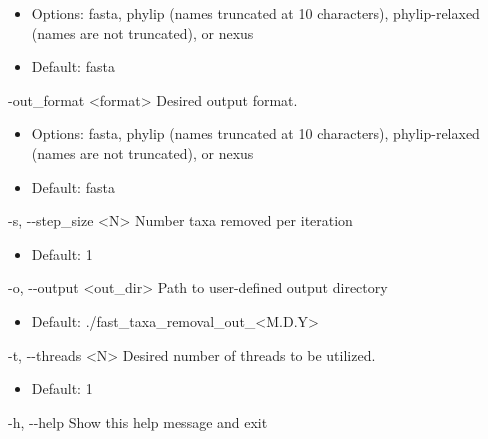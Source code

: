 \documentclass{article}
\begin{document}
\begin{description}
\begin{description}
\begin{description}
                    \begin{itemize}
                        \item Options: fasta, phylip (names truncated at 10 characters), phylip-relaxed (names are not truncated), or nexus
                        \item Default: fasta
                    \end{itemize}
                    \item -out\_format \hspace{0.2cm} <format> \hspace{0.2cm} Desired output format.
                    \begin{itemize}
                        \item Options: fasta, phylip (names truncated at 10 characters), phylip-relaxed (names are not truncated), or nexus
                        \item Default: fasta
                    \end{itemize}
                    \item -s, -\/-step\_size \hspace{0.2cm} <N> \hspace{0.2cm} Number taxa removed per iteration
                    \begin{itemize}
                        \item Default: 1
                    \end{itemize}
                    \item -o, -\/-output \hspace{0.2cm} <out\_dir> \hspace{0.2cm} Path to user-defined output directory
                    \begin{itemize}
                        \item Default: ./fast\_taxa\_removal\_out\_<M.D.Y>
                    \end{itemize}
                    \item -t, -\/-threads \hspace{0.2cm} <N> \hspace{0.2cm} Desired number of threads to be utilized.
                    \begin{itemize}
                    \item Default: 1
                    \end{itemize}
                    \item -h, -\/-help \hspace{0.2cm} Show this help message and exit 

\end{description}
\end{description}
\end{description}
\end{document}
